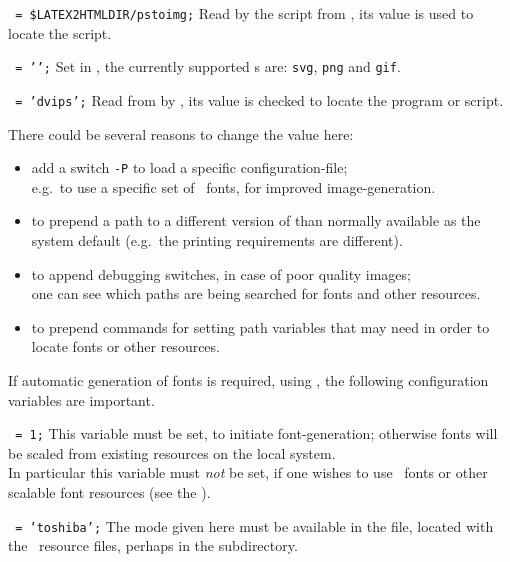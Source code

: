 \begin{htmllist}
\item [\fn{\$PSTOIMG}\texttt{ = \char34\$LATEX2HTMLDIR/pstoimg\char34;}]
Read by the  \Perl{} script from , 
its value is used to locate the  \Perl{} script.

\item [\fn{\$IMAGE\_TYPE}\texttt{ = '\Meta{image-type}';}]
Set in , the currently supported s
are: \texttt{svg}, \texttt{png} and \texttt{gif}.

\item [\fn{\$DVIPS}\texttt{ = 'dvips';}]
Read from  by , 
its value is checked to locate the  program or script.

\smallskip\noindent
There could be several reasons to change the value here:
\begin{itemize}
\item
add a switch \texttt{-P} to load a specific configuration-file;\\
e.g.\ to use a specific set of \PS\ fonts, for improved image-generation.
\item
to prepend a path to a different version of  than normally
available as the system default (e.g.\ the printing requirements are different).
\item
to append debugging switches, in case of poor quality images;\\
one can see which paths are being searched for fonts and other resources.
\item
to prepend commands for setting path variables that  may need
in order to locate fonts or other resources.
\end{itemize}

If automatic generation of fonts is required, using \MF, the following
configuration variables are important.
%
\begin{htmllist}%
%
\item [\fn{\$PK\_GENERATION}\texttt{ = 1;}\label{pkgen}]
This variable must be set, to initiate font-generation; otherwise fonts
will be scaled from existing resources on the local system.\\
In particular this variable must \emph{not} be set, if one wishes to use
\PS\ fonts or other scalable font resources 
(see the  ).

\item [\fn{\$DVIPS\_MODE}\texttt{ = 'toshiba';}]
The mode given here must be available in the  file,
located with the \MF\ resource files, perhaps in the  subdirectory.


\end{htmllist}
\end{htmllist}
